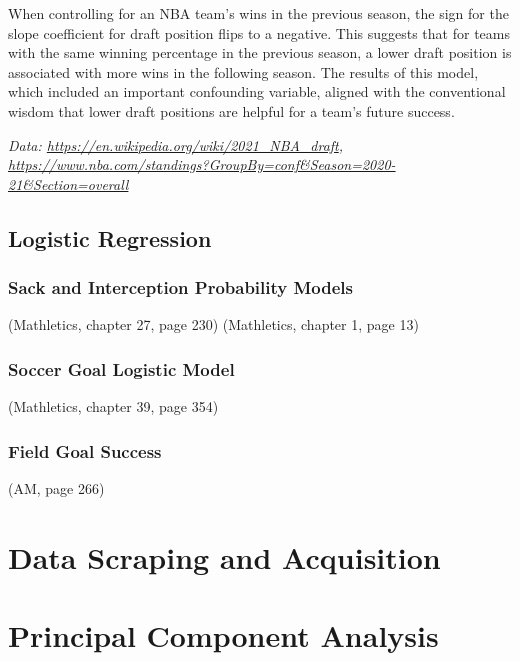 \documentclass[
  11pt,
]{book}
\theoremstyle{definition}
\theoremstyle{definition}
\theoremstyle{definition}
\theoremstyle{definition}
\theoremstyle{remark}
\begin{document}
When controlling for an NBA team's wins in the previous season, the sign for the slope coefficient for draft position flips to a negative. This suggests that for teams with the same winning percentage in the previous season, a lower draft position is associated with more wins in the following season. The results of this model, which included an important confounding variable, aligned with the conventional wisdom that lower draft positions are helpful for a team's future success.

\emph{Data: \url{https://en.wikipedia.org/wiki/2021_NBA_draft}, \url{https://www.nba.com/standings?GroupBy=conf\&Season=2020-21\&Section=overall}}

\hypertarget{logistic-regression}{%
\section{Logistic Regression}\label{logistic-regression}}

\hypertarget{sack-and-interception-probability-models}{%
\subsection{Sack and Interception Probability Models}\label{sack-and-interception-probability-models}}

(Mathletics, chapter 27, page 230)
(Mathletics, chapter 1, page 13)

\hypertarget{soccer-goal-logistic-model}{%
\subsection{Soccer Goal Logistic Model}\label{soccer-goal-logistic-model}}

(Mathletics, chapter 39, page 354)

\hypertarget{field-goal-success}{%
\subsection{Field Goal Success}\label{field-goal-success}}

(AM, page 266)

\newpage

\hypertarget{data-scraping-and-acquisition}{%
\chapter{Data Scraping and Acquisition}\label{data-scraping-and-acquisition}}

\hypertarget{principal-component-analysis}{%
\chapter{Principal Component Analysis}\label{principal-component-analysis}}
\end{document}
